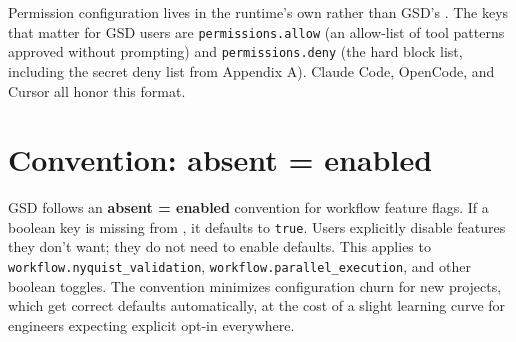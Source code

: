 \documentclass[11pt,letterpaper,openany]{book}
\begin{document}
Permission configuration lives in the runtime's own  rather than GSD's . The keys that matter for GSD users are \texttt{permissions.allow} (an allow-list of tool patterns approved without prompting) and \texttt{permissions.deny} (the hard block list, including the secret deny list from Appendix A). Claude Code, OpenCode, and Cursor all honor this format.

\section{Convention: absent = enabled}

GSD follows an \textbf{absent = enabled} convention for workflow feature flags. If a boolean key is missing from , it defaults to \texttt{true}. Users explicitly disable features they don't want; they do not need to enable defaults. This applies to \texttt{workflow.nyquist\_validation}, \texttt{workflow.parallel\_execution}, and other boolean toggles. The convention minimizes configuration churn for new projects, which get correct defaults automatically, at the cost of a slight learning curve for engineers expecting explicit opt-in everywhere.
\end{document}

